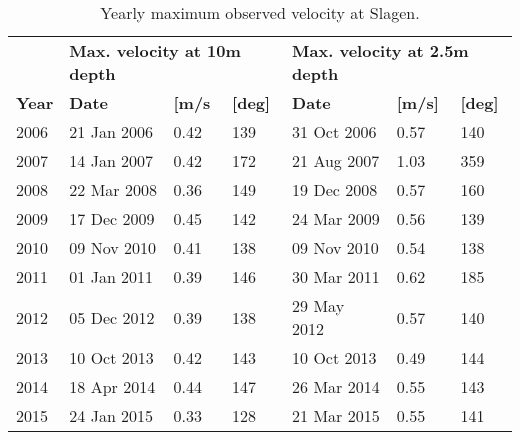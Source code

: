 \begin{table}[htb]
	\caption{Yearly maximum observed velocity at Slagen.}
	\label{tab:Slagen_max}
	\centering
	\begin{tabular}{|l|lll|lll|}
\hline 
		& \multicolumn{3}{|l|}{\bf Max. velocity at 10m depth} & \multicolumn{3}{|l|}{\bf Max. velocity at 2.5m depth} \\
{\bf \small Year} & {\bf \small Date} & {\bf \small [m/s} & {\bf \small [deg]} & {\bf \small Date} & {\bf \small [m/s]} & {\bf \small [deg]} \\ \hline 
\small 2006 & \small 21 Jan 2006 & \small 0.42 & \small 139 & \small 31 Oct 2006 & \small 0.57 & \small 140 \\
\small 2007 & \small 14 Jan 2007 & \small 0.42 & \small 172 & \small 21 Aug 2007 & \small 1.03 & \small 359 \\
\small 2008 & \small 22 Mar 2008 & \small 0.36 & \small 149 & \small 19 Dec 2008 & \small 0.57 & \small 160 \\
\small 2009 & \small 17 Dec 2009 & \small 0.45 & \small 142 & \small 24 Mar 2009 & \small 0.56 & \small 139 \\
\small 2010 & \small 09 Nov 2010 & \small 0.41 & \small 138 & \small 09 Nov 2010 & \small 0.54 & \small 138 \\
\small 2011 & \small 01 Jan 2011 & \small 0.39 & \small 146 & \small 30 Mar 2011 & \small 0.62 & \small 185 \\
\small 2012 & \small 05 Dec 2012 & \small 0.39 & \small 138 & \small 29 May 2012 & \small 0.57 & \small 140 \\
\small 2013 & \small 10 Oct 2013 & \small 0.42 & \small 143 & \small 10 Oct 2013 & \small 0.49 & \small 144 \\
\small 2014 & \small 18 Apr 2014 & \small 0.44 & \small 147 & \small 26 Mar 2014 & \small 0.55 & \small 143 \\
\small 2015 & \small 24 Jan 2015 & \small 0.33 & \small 128 & \small 21 Mar 2015 & \small 0.55 & \small 141 \\
\hline
	\end{tabular}
\end{table}

